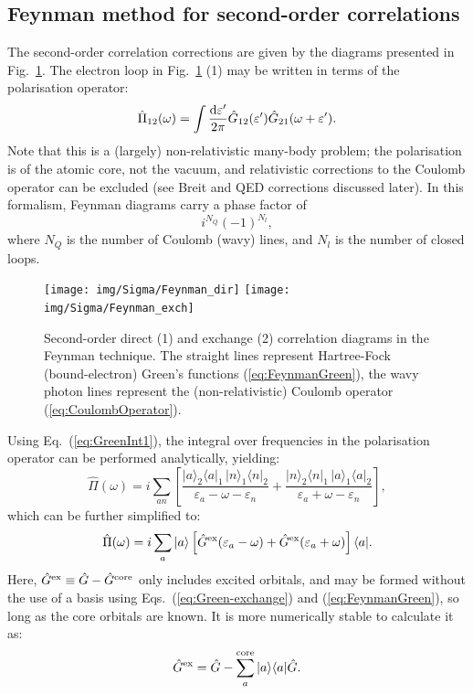 \documentclass[10pt,twocolumn,a4paper]{article}%
\newcommand{\bra}[1]{\ensuremath{\langle #1|}}	%
\newcommand{\ket}[1]{\ensuremath{|#1\rangle}}	%
\newcommand{\be}{\begin{equation}}
\newcommand{\ee}{\end{equation}}
\def\d{\ensuremath{{\rm d}}}
\def\en{\ensuremath{\varepsilon}}
\newcommand{\w}{\ensuremath{\omega}}
\begin{document}
\subsection{Feynman method for second-order correlations}



The second-order correlation corrections are given by the diagrams presented in Fig.~\ref{fig:Sigma2-Feyn}.
The electron loop in Fig.~\ref{fig:Sigma2-Feyn} (1) may be written in terms of the polarisation operator:
\be\label{eq:PolarisationOperator}
\hat\Pi_{12}(\w) = \int \frac{\d \en'}{2\pi}\hat  G_{12}(\en') \hat G_{21}(\w+\en') .
\ee
Note that this is a (largely) non-relativistic many-body problem; the polarisation is of the atomic core, not the vacuum, and relativistic corrections to the Coulomb operator can be excluded (see Breit and QED corrections discussed later).
In this formalism, Feynman diagrams carry a phase factor of
\be\label{eq:phaseFactor}
i^{N_{Q}}(-1)^{N_{l}},
\ee
where $N_{Q}$ is the number of Coulomb (wavy) lines, and $N_{l}$ is the number of closed loops.


\begin{figure}%
\centering
\texttt{[image: img/Sigma/Feynman\_dir]}
\texttt{[image: img/Sigma/Feynman\_exch]}
\caption{\label{fig:Sigma2-Feyn}\small Second-order direct (1) and exchange (2) correlation diagrams in the Feynman technique.
The straight lines represent Hartree-Fock (bound-electron) Green's functions (\ref{eq:FeynmanGreen}),
the wavy photon lines represent the (non-relativistic) Coulomb operator (\ref{eq:CoulombOperator}).
}
\end{figure}


Using Eq.~(\ref{eq:GreenInt1}), the integral over frequencies in the polarisation operator can be performed analytically, yielding:
\be\label{eq:PiGreen2}
\hat\Pi(\w) = i\sum_{an}\left[
\frac{\ket{a}_2\bra{a}_1 \, \ket{n}_1\bra{n}_2}{\en_a-\w-\en_n}
+
\frac{\ket{n}_2\bra{n}_1 \, \ket{a}_1\bra{a}_2}{\en_a+\w-\en_n}
\right],
\ee
which can be further simplified to:
\be\label{eq:PiGreen}
\hat\Pi(\w) = i\sum_a \ket{a}\left[\hat G^{\rm ex}(\en_a -\w) +  \hat G^{\rm ex}(\en_a +\w)\right]\bra{a}.
\ee
Here, $\hat G^{\rm ex}\equiv\hat G-\hat G^{\rm core}$ only includes excited orbitals, and may be formed without the use of a basis using Eqs.~(\ref{eq:Green-exchange}) and (\ref{eq:FeynmanGreen}), so long as the core orbitals are known.
It is more numerically stable to calculate it as:
\be\label{eq:Gex}
\hat G^{\rm ex} =  \hat G - \sum_a^{\rm core} \ket{a}\bra{a}\hat G.
\ee
\end{document}
